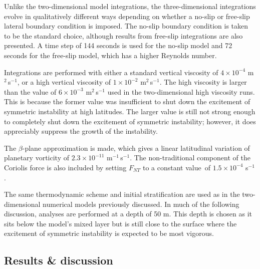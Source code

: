Unlike the two-dimensional model integrations, the three-dimensional integrations evolve in qualitatively different ways depending on whether a no-slip or free-slip lateral boundary condition is imposed. The no-slip boundary condition is taken to be the standard choice, although results from free-slip integrations are also presented. A time step of 144 seconds is used for the no-slip model and 72 seconds for the free-slip model, which has a higher Reynolds number.

Integrations are performed with either a standard vertical viscosity of $4\times 10^{-4}$ m$^2$\,s$^{-1}$, or a high vertical viscosity of $1\times 10^{-2}$ m$^2$\,s$^{-1}$. The high viscosity is larger than the value of $6\times 10^{-3}$ m$^2$\,s$^{-1}$ used in the two-dimensional high viscosity runs. This is because the former value was insufficient to shut down the excitement of symmetric instability at high latitudes. The larger value is still not strong enough to completely shut down the excitement of symmetric instability; however, it does appreciably suppress the growth of the instability.

The $\beta$-plane approximation is made, which gives a linear latitudinal variation of planetary vorticity of $2.3\times 10^{-11}$ m$^{-1}$\,s$^{-1}$. The non-traditional component of the Coriolis force is also included by setting $F_{NT}$ to a constant value\footnotemark~of $1.5\times 10^{-4}$ s$^{-1}$.


The same thermodynamic scheme and initial stratification are used as in the two-dimensional numerical models previously discussed. In much of the following discussion, analyses are performed at a depth of 50 m. This depth is chosen as it sits below the model's mixed layer but is still close to the surface where the excitement of symmetric instability is expected to be most vigorous.

\subsection{Results \& discussion}
\label{subsec:3DResults}
